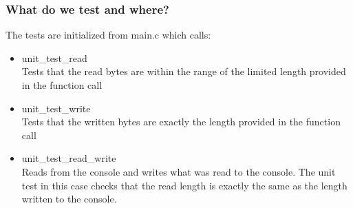 \documentclass[a4paper,12pt,danish]{report}
\begin{document}
\subsubsection{What do we test and where?}
The tests are initialized from main.c which calls:
\\
\begin{itemize}
  \item{unit\_test\_read}
    \\
    Tests that the read bytes are within the range of the limited length provided in the function call
  \item{unit\_test\_write}
    \\
    Tests that the written bytes are exactly the length provided in the function call
  \item{unit\_test\_read\_write}
    \\
    Reads from the console and writes what was read to the console.
    The unit test in this case checks that the read length is exactly the same as the length written to the console.
\end{itemize}
\end{document}
